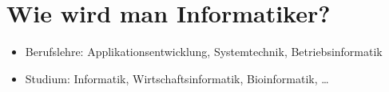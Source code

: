 \section{Wie wird man Informatiker?}
\label{sec:wie-wird-man-informatiker}

\begin{itemize}
    \item Berufslehre: Applikationsentwicklung, Systemtechnik, Betriebsinformatik
    \item Studium: Informatik, Wirtschaftsinformatik, Bioinformatik, \ldots
\end{itemize}

